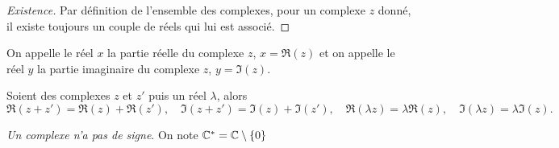 \begin{proof}[Existence]
    Par définition de l'ensemble des complexes, pour un complexe \(z\) donné, il 
    existe toujours un couple de réels qui lui est associé.
\end{proof}
On appelle le réel \(x\) la partie réelle du complexe \(z\), \(x=\Re(z)\) et on 
appelle le réel \(y\) la partie imaginaire du complexe \(z\), \(y=\Im(z)\).
\begin{prop}
    Soient des complexes \(z\) et \(z'\) puis un réel \(\lambda\), alors
    \begin{equation}
        \Re(z+z')=\Re(z)+\Re(z'), \quad \Im(z+z')=\Im(z)+\Im(z'), \quad 
        \Re(\lambda z)=\lambda \Re(z), \quad \Im(\lambda z)=\lambda \Im(z).
    \end{equation}
\end{prop}
\emph{Un complexe n'a pas de signe}. On note \(\mathbb{C}^*=\mathbb{C} \setminus \{0\}\)
